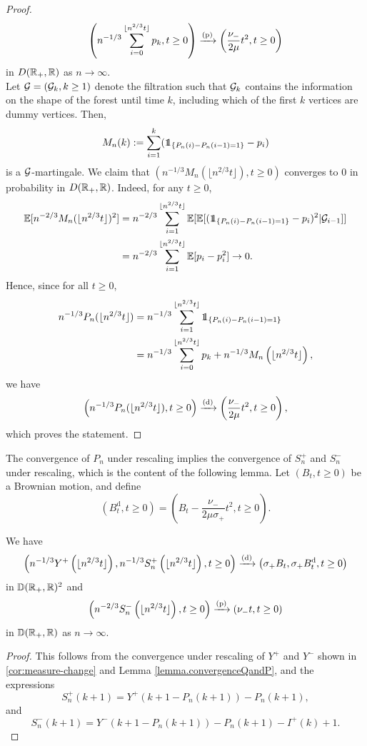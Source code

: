 \begin{proof}
$$\left(n^{-1/3}\sum_{i=0}^{\lfloor n^{2/3}t \rfloor} p_k , t \geq 0\right)\xrightarrow[]{\mathrm{(p)}} \left(\frac{\nu_-}{2\mu}t^2,t\geq 0\right)$$
in $D({\mathbb R}_+,{\mathbb R})$ as $n\to \infty$. \\
Let ${\mathcal G}=({\mathcal G}_k,k\geq 1)$ denote the filtration such that ${\mathcal G}_{k}$ contains the information on the shape of the forest until time $k$, including which of the first $k$ vertices are dummy vertices. Then, 
$$M_n(k):=\sum_{i=1}^k (\one_{\{P_n(i)-P_n(i-1)=1\}}-p_i)$$ is a ${\mathcal G}$-martingale. We claim that $(n^{-1/3}M_n(\lfloor n^{2/3} t\rfloor ), t\geq 0)$ converges to $0$ in probability in $D({\mathbb R}_+,{\mathbb R})$. Indeed, for any $t\geq 0$,
\begin{align*}\E[n^{-2/3}M_n(\lfloor n^{2/3} t\rfloor )^2]&=n^{-2/3}\sum_{i=1}^{\lfloor n^{2/3} t\rfloor} \E[\E[(\one_{\{P_n(i)-P_n(i-1)=1\}}-p_i)^2|\cG_{i-1}]]\\&=n^{-2/3}\sum_{i=1}^{\lfloor n^{2/3} t\rfloor} \E[p_i-p_i^2]\to 0.\end{align*}
Hence, since for all $t\geq 0$,
\begin{align*}n^{-1/3}P_n(\lfloor n^{2/3}t\rfloor)&=n^{-1/3}\sum_{i=1}^{\lfloor n^{2/3}t\rfloor}  \one_{\{P_n(i)-P_n(i-1)=1\}}\\
&= n^{-1/3}\sum_{i=0}^{\lfloor n^{2/3}t \rfloor} p_k + n^{-1/3} M_n\left(\lfloor n^{2/3}t\rfloor\right),
\end{align*}
we have
$$\left(n^{-1/3}P_n(\lfloor n^{2/3}t\rfloor),t\geq 0\right)\xrightarrow[]{\mathrm{(d)}}  \left( \frac{\nu_-}{2\mu}t^2, t\geq 0 \right),$$
 which proves the statement.

\end{proof}

The convergence of $P_n$ under rescaling implies the convergence of $S^{+}_n$ and $S^{-}_n$ under rescaling, which is the content of the following lemma. Let $(B_t,t\geq 0)$ be a Brownian motion, and define 
$$({B}^{\mathrm{d}}_t,t\geq 0)=\left(B_t-\frac{\nu_-}{2\mu\sigma_+}t^2,t\geq 0\right).$$ 

\begin{lemma}
\label{lem:lukasiewiczpathpurplevertices}
 We have 
 \begin{align*}\left(n^{-1/3}Y^{+}\left(\lfloor n^{2/3}t\rfloor\right), n^{-1/3}S^{+}_n\left(\lfloor n^{2/3}t\rfloor\right), t\geq 0\right)\xrightarrow[]{\mathrm{(d)}}\left(\sigma_+B_t,\sigma_+B^{\mathrm{d}}_t,  t\geq 0\right)\end{align*}
 in ${\mathbb D}({\mathbb R}_+,{\mathbb R})^2$  and 
 $$\left(n^{-2/3}S^{-}_n\left(\lfloor n^{2/3}t\rfloor\right),t\geq 0\right)\xrightarrow[]{\mathrm{(p)}}\left(\nu_- t,t\geq 0\right)$$
 in ${\mathbb D}({\mathbb R}_+,{\mathbb R})$ as $n\to\infty$.
\end{lemma}
\begin{proof}
 This follows from the convergence under rescaling of $Y^+$ and $Y^-$ shown in \cref{cor:measure-change} and Lemma \ref{lemma.convergenceQandP}, and the expressions 
 $$S_n^{+}(k+1)=Y^+\left(k+1-P_n(k+1)\right)-P_n(k+1),$$ and $$S_n^{-}(k+1)=Y^-\left(k+1-P_n(k+1)\right)-P_n(k+1)-I^{+}(k)+1.$$
\end{proof}

